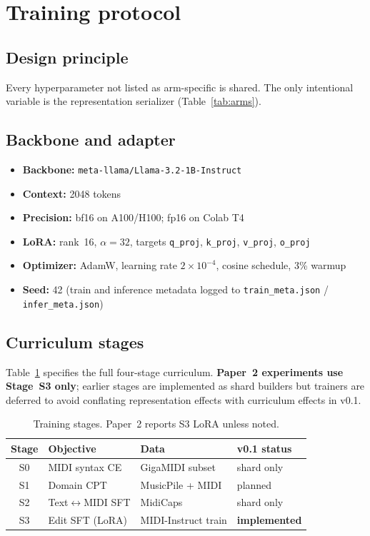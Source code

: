 \section{Training protocol}
\label{sec:train}

\subsection{Design principle}

Every hyperparameter not listed as arm-specific is shared. The only intentional variable is the representation serializer (Table~\ref{tab:arms}).

\subsection{Backbone and adapter}

\begin{itemize}[leftmargin=*]
\item \textbf{Backbone:} \texttt{meta-llama/Llama-3.2-1B-Instruct}
\item \textbf{Context:} 2048 tokens
\item \textbf{Precision:} bf16 on A100/H100; fp16 on Colab T4
\item \textbf{LoRA:} rank~16, $\alpha{=}32$, targets \texttt{q\_proj}, \texttt{k\_proj}, \texttt{v\_proj}, \texttt{o\_proj}
\item \textbf{Optimizer:} AdamW, learning rate $2\times10^{-4}$, cosine schedule, 3\% warmup
\item \textbf{Seed:} 42 (train and inference metadata logged to \texttt{train\_meta.json} / \texttt{infer\_meta.json})
\end{itemize}

\subsection{Curriculum stages}

Table~\ref{tab:stages} specifies the full four-stage curriculum. \textbf{Paper~2 experiments use Stage~S3 only}; earlier stages are implemented as shard builders but trainers are deferred to avoid conflating representation effects with curriculum effects in v0.1.

\begin{table}[h]
\centering
\small
\begin{tabular}{@{}clll@{}}
\toprule
\textbf{Stage} & \textbf{Objective} & \textbf{Data} & \textbf{v0.1 status} \\
\midrule
S0 & MIDI syntax CE & GigaMIDI subset & shard only \\
S1 & Domain CPT & MusicPile + MIDI & planned \\
S2 & Text$\leftrightarrow$MIDI SFT & MidiCaps & shard only \\
S3 & Edit SFT (LoRA) & MIDI-Instruct train & \textbf{implemented} \\
\bottomrule
\end{tabular}
\caption{Training stages. Paper~2 reports S3 LoRA unless noted.}
\label{tab:stages}
\end{table}

